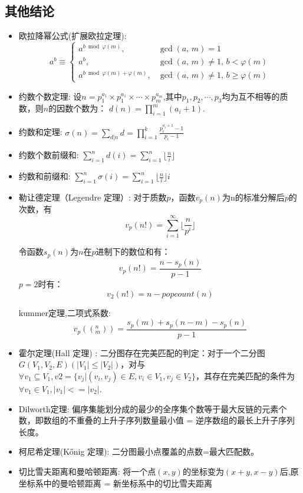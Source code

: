 \subsection{其他结论}

\begin{itemize}
    \item 欧拉降幂公式(扩展欧拉定理):
		$$a^b\equiv
        \begin{cases}
        a^{b\bmod\varphi(m)},\,&\gcd(a,\,m)=1\\
        a^b,&\gcd(a,\,m)\ne1,\,b<\varphi(m)\\
        a^{b\bmod\varphi(m)+\varphi(m)},&\gcd(a,\,m)\ne1,\,b\ge\varphi(m)
        \end{cases}$$
    \item 约数个数定理: 设$n = p_1^{a_1}\times p_1^{a_1} \times \cdots \times p_m^{a_m}$,其中$p_1,p_2,\cdots,p_3$均为互不相等的质数，则$n$的因数个数为：
$d(n) = \prod\limits_{i = 1}^{m}(a_i + 1)$.

    \item 约数和定理: $\sigma(n) = \sum\limits_{d | n} d = \prod\limits_{i = 1}^{k} \frac{p_i^{a_i+1} - 1}{p_i - 1}$
    \item 约数个数前缀和: $\sum \limits _{i = 1}^{n} d(i) = \sum \limits _{i = 1}^{n}{\lfloor \frac{n}{i} \rfloor}$
    \item 约数和前缀和: $\sum \limits _{i = 1}^{n} \sigma(i) = \sum \limits _{i = 1}^{n}{\lfloor \frac{n}{i} \rfloor i}$
    \item 勒让德定理（Legendre 定理）: 
        对于质数$p$，函数$v_p(n)$为n的标准分解后$p$的次数，有
        $$v_p(n!) = \sum\limits_{i = 1}^{\infty} \lfloor \frac{n}{p^i} \rfloor$$

        令函数$s_p(n)$为$n$在$p$进制下的数位和有：
        $$v_p(n!) = \frac{n - s_p(n)}{p - 1}$$
        $p = 2$时有：
        $$v_2(n!) = n - popcount(n)$$

        kummer定理,二项式系数:
        $$v_p((^n_m)) = \frac{s_p(m)+s_p(n - m)-s_p(n)}{p - 1}$$
    
    \item 霍尔定理(Hall 定理) :
            二分图存在完美匹配的判定：对于一个二分图$G(V_1,V_2,E) (|V_1| \le |V_2|)$，对与$\forall v_1 \subseteq V_1,v2 = \{v_j | (v_i,v_j) \in E,v_i \in V_1,v_j \in V_2 \}$，其存在完美匹配的条件为$\forall v_1 
            \in V_1,|v_1| <= |v_2|$.
    \item Dilworth定理: 偏序集能划分成的最少的全序集个数等于最大反链的元素个数，即数组的不重叠的上升子序列数量最小值 = 逆序数组的最长上升子序列长度。
    \item 柯尼希定理(Kőnig 定理): 二分图最小点覆盖的点数=最大匹配数。
    \item 切比雪夫距离和曼哈顿距离:
        将一个点$(x,y)$的坐标变为$(x+y,x - y)$后,原坐标系中的曼哈顿距离 = 新坐标系中的切比雪夫距离


\end{itemize}
